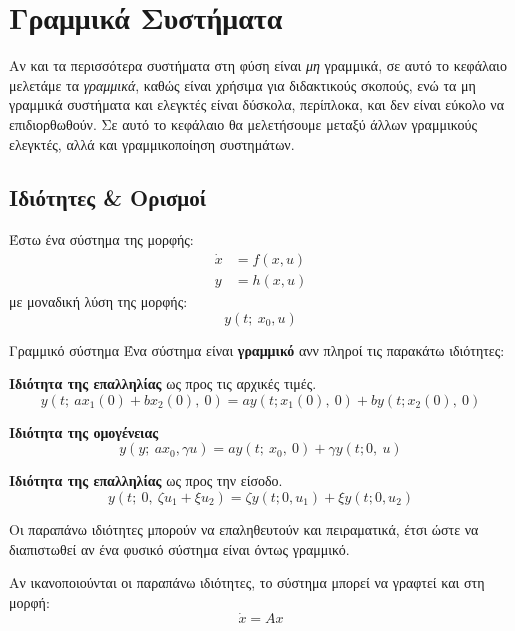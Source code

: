 \documentclass[11pt,a4paper,notitlepage,fleqn]{article}
\begin{document}
\section{Γραμμικά Συστήματα}
Αν και τα περισσότερα συστήματα στη φύση είναι \textit{μη} γραμμικά, σε αυτό το κεφάλαιο μελετάμε τα \textit{γραμμικά}, καθώς είναι χρήσιμα
για διδακτικούς σκοπούς, ενώ τα μη γραμμικά συστήματα και ελεγκτές είναι
δύσκολα, περίπλοκα, και δεν είναι εύκολο να επιδιορθωθούν.
Σε αυτό το κεφάλαιο θα μελετήσουμε μεταξύ άλλων γραμμικούς ελεγκτές, αλλά
και γραμμικοποίηση συστημάτων.

\subsection{Ιδιότητες \& Ορισμοί}
Έστω ένα σύστημα της μορφής:
\begin{align*}
	\dot x &= f(x,u) \\
	y &= h(x,u)
\end{align*}
με μοναδική λύση της μορφής:
\[
y(t;\ x_0,u)
\]

\begin{defn}{Γραμμικό σύστημα}{}
	Ένα σύστημα είναι \textbf{γραμμικό} ανν πληροί τις παρακάτω ιδιότητες:
	\begin{enumroman}
		\item \textbf{Ιδιότητα της επαλληλίας} ως προς τις αρχικές τιμές.
		\[
		y\left(t;\ ax_1(0)+bx_2(0),\ 0\right)
		=
		ay\left(t; x_1(0),\ 0\right)
		+ by\left(t; x_2(0),\ 0\right)
		\]
		
		\item \textbf{Ιδιότητα της ομογένειας}%
		\[
		y\left(y;\ ax_0,\gamma u\right)
		= ay(t;\ x_0,\ 0) + \gamma y(t; 0,\ u)
		\]
		
		\item \textbf{Ιδιότητα της επαλληλίας} ως προς την είσοδο.
		\[
		y\left(t;\ 0,\ \zeta u_1+\xi u_2\right)
		= \zeta y(t;0,u_1) + \xi y(t; 0,u_2)
		\]
	\end{enumroman}
\end{defn}

Οι παραπάνω ιδιότητες μπορούν να επαληθευτούν και πειραματικά, έτσι ώστε
να διαπιστωθεί αν ένα φυσικό σύστημα είναι όντως γραμμικό.

Αν ικανοποιούνται οι παραπάνω ιδιότητες, το σύστημα μπορεί να γραφτεί
και στη μορφή:
\[
\dot x = Ax
\]
\end{document}
